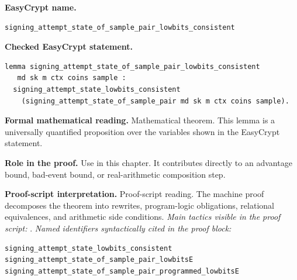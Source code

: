 \begin{formaltheorem}
\noindent\textbf{EasyCrypt name.}
\begin{lstlisting}[language=EasyCrypt,basicstyle=\ttfamily\scriptsize]
signing_attempt_state_of_sample_pair_lowbits_consistent
\end{lstlisting}
\noindent\textbf{Checked EasyCrypt statement.}
\begin{lstlisting}[language=EasyCrypt,basicstyle=\ttfamily\scriptsize]
lemma signing_attempt_state_of_sample_pair_lowbits_consistent
   md sk m ctx coins sample :
  signing_attempt_state_lowbits_consistent
    (signing_attempt_state_of_sample_pair md sk m ctx coins sample).
\end{lstlisting}
\noindent\textbf{Formal mathematical reading.}
Mathematical theorem. This lemma is a universally quantified proposition over the variables shown in the EasyCrypt statement.

\noindent\textbf{Role in the proof.}
Use in this chapter. It contributes directly to an advantage bound, bad-event bound, or real-arithmetic composition step.

\noindent\textbf{Proof-script interpretation.}
Proof-script reading. The machine proof decomposes the theorem into rewrites, program-logic obligations, relational equivalences, and arithmetic side conditions.
\emph{Main tactics visible in the proof script:} .
\emph{Named identifiers syntactically cited in the proof block:}
\begin{lstlisting}[language=EasyCrypt,basicstyle=\ttfamily\scriptsize]
signing_attempt_state_lowbits_consistent
signing_attempt_state_of_sample_pair_lowbitsE
signing_attempt_state_of_sample_pair_programmed_lowbitsE
\end{lstlisting}

\end{formaltheorem}

